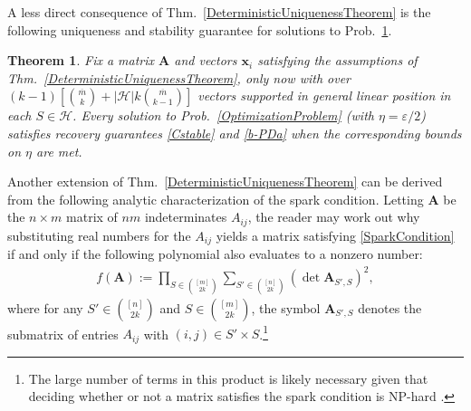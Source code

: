 \documentclass[journal, twocolumn]{IEEEtran}
\newtheorem{theorem}{Theorem}
\begin{document}


A less direct consequence of Thm.~\ref{DeterministicUniquenessTheorem} is the following uniqueness and stability guarantee for solutions to Prob.~\ref{SLCopt}.

\begin{theorem}\label{SLCopt}
Fix a matrix $\mathbf{A}$ and vectors $\mathbf{x}_i$ satisfying the assumptions of Thm.~\ref{DeterministicUniquenessTheorem}, only now with over \mbox{$(k-1)\left[ {\overline m \choose k} + |\mathcal{H}|k{\overline m \choose k-1}\right]$} vectors supported in general linear position in each $S \in \mathcal{H}$. Every solution to Prob.~\ref{OptimizationProblem} (with $\eta = \varepsilon/2$) satisfies recovery guarantees \eqref{Cstable} and \eqref{b-PDa} when the corresponding bounds on $\eta$ are met.
\end{theorem}

Another extension of Thm.~\ref{DeterministicUniquenessTheorem} can be derived from the following analytic characterization of the spark condition.  Letting $\mathbf{A}$ be the $n \times m$ matrix of $nm$ indeterminates $A_{ij}$, the reader may work out why substituting real numbers for the $A_{ij}$ yields a matrix satisfying \eqref{SparkCondition} if and only if the following polynomial also evaluates to a nonzero number:
\begin{align*}
f(\mathbf{A}) := \prod_{S \in {[m] \choose 2k}} \sum_{S' \in {[n] \choose 2k}} (\det \mathbf{A}_{S',S})^2,
\end{align*}
%
where for any $S' \in {[n] \choose 2k}$ and $S \in {[m] \choose 2k}$, the symbol $\mathbf{A}_{S',S}$ denotes the submatrix of entries $A_{ij}$ with $(i,j) \in S' \times S$.\footnote{The large number of terms in this product is likely necessary given that deciding whether or not a matrix satisfies the spark condition is NP-hard \cite{tillmann2014computational}.}
\end{document}
